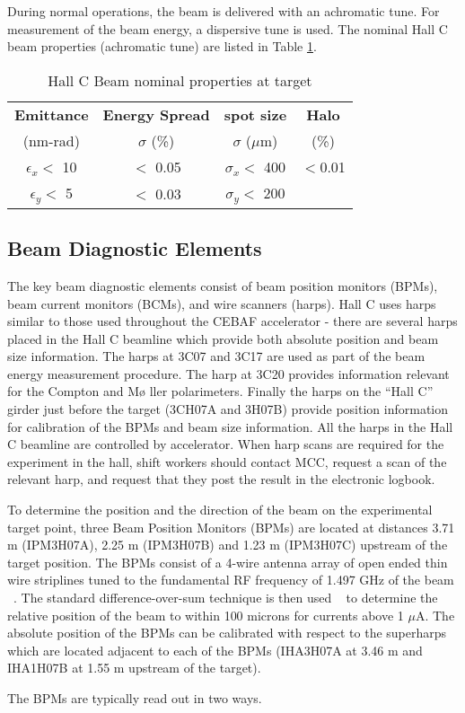 {During normal operations, the beam is delivered with an achromatic
tune.  For measurement of the beam energy, a dispersive tune is
used. The nominal Hall C beam properties (achromatic tune) are listed
in Table \ref{beam_tab3}.

\begin{table}[hp]
\begin{center}
\begin{tabular}{|c|c|c|c|} \hline
{\bf Emittance}  & {\bf Energy Spread} & {\bf spot size}  & {\bf Halo}  \\
   (nm-rad)       &   $\sigma$ (\%)     & $\sigma$ ($\mu$m)&  (\%) \\ \hline
$\epsilon_x <$ 10 &  $<$ 0.05           & $\sigma_x<$ 400  &  $<$0.01 \\
$\epsilon_y <$ 5  &  $<$ 0.03           & $\sigma_y<$ 200  &        \\ \hline
\end{tabular}
\end{center}
\caption[Beamline: Hall C Beam nominal properties at target]{Hall C Beam nominal properties at target}
\label{beam_tab3}
\end{table}

\subsection{Beam Diagnostic Elements}

The key beam diagnostic elements consist of beam position monitors
(BPMs), beam current monitors (BCMs), and wire scanners (harps). Hall
C uses harps similar to those used throughout the CEBAF accelerator -
there are several harps placed in the Hall C beamline which provide
both absolute position and beam size information.  The harps at 3C07
and 3C17 are used as part of the beam energy measurement procedure.
The harp at 3C20 provides information relevant for the Compton and M\o
ller polarimeters. Finally the harps on the ``Hall C'' girder just
before the target (3CH07A and 3H07B) provide position information for
calibration of the BPMs and beam size information. All the harps in
the Hall C beamline are controlled by accelerator. When harp scans are
required for the experiment in the hall, shift workers should contact
MCC, request a scan of the relevant harp, and request that they post
the result in the electronic logbook.

To determine the position and the direction of the beam on the
experimental target point, three Beam Position Monitors (BPMs) are
located at distances 3.71 m (IPM3H07A), 2.25 m (IPM3H07B) and 1.23 m
(IPM3H07C) upstream of the target position.  The BPMs consist of a
4-wire antenna array of open ended thin wire striplines tuned to the
fundamental RF frequency of 1.497 GHz of the beam
~\cite{bi:bar90}. The standard difference-over-sum technique is then
used ~\cite{bi:HW} to determine the relative position of the beam to
within 100 microns for currents above 1 $\mu $A. The absolute position
of the BPMs can be calibrated with respect to the superharps which are
located adjacent to each of the BPMs (IHA3H07A at 3.46 m and IHA1H07B
at 1.55 m upstream of the target).

The BPMs are typically read out in two ways.
}

